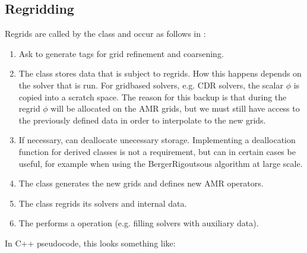 \documentclass[letterpaper,10pt,english]{sphinxmanual}
\begin{document}
\subsection{Regridding}
\label{\detokenize{Source/Driver:regridding}}
\sphinxAtStartPar
Regrids are called by the  class and occur as follows in :
\begin{enumerate}
%
\item {} 
\sphinxAtStartPar
Ask  to generate tags for grid refinement and coarsening.

\item {} 
\sphinxAtStartPar
The  class stores data that is subject to regrids.
How this happens depends on the solver that is run.
For grid\sphinxhyphen{}based solvers, e.g. CDR solvers, the scalar \(\phi\) is copied into a scratch space.
The reason for this backup is that during the regrid \(\phi\) will be allocated on the  AMR grids, but we must still have access to the previously defined data in order to interpolate to the new grids.

\item {} 
\sphinxAtStartPar
If necessary,  can deallocate unecessary storage.
Implementing a deallocation function for \sphinxhyphen{}derived classes is not a requirement, but can in certain cases be useful, for example when using the Berger\sphinxhyphen{}Rigoutsous algorithm at large scale.

\item {} 
\sphinxAtStartPar
The  class generates the new grids and defines new AMR operators.

\item {} 
\sphinxAtStartPar
The  class regrids its solvers and internal data.

\item {} 
\sphinxAtStartPar
The  performs a  operation (e.g. filling solvers with auxiliary data).

\end{enumerate}

\sphinxAtStartPar
In C++ pseudo\sphinxhyphen{}code, this looks something like:
\end{document}
